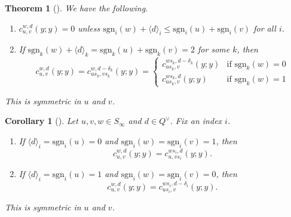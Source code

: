 \documentclass{amsart}
\newtheorem{corollary}[lemma]{Corollary}
\newtheorem{theorem}[lemma]{Theorem}
\theoremstyle{definition}
\theoremstyle{remark}
\numberwithin{equation}{section}
\begin{document}
\begin{theorem}[{\cite[Theorem~2.7]{huang2015equivariant}}] \label{theorem:quantclass}
	We have the following.
	\begin{enumerate}
	\item $c_{u,v}^{w,d}(y;y)=0$ unless $\mathrm{sgn}_i(w)+\langle d\rangle_i\leq \mathrm{sgn}_i(u)+\mathrm{sgn}_i(v)$ for all $i$.
	\item If $\mathrm{sgn}_k(w)+\langle d\rangle_k=\mathrm{sgn}_k(u)+\mathrm{sgn}_k(v)=2$ for some $k$, then
	$$c_{u,v}^{w,d}(y;y)=c_{us_k,vs_k}^{w,d-\delta_k}(y;y)=\begin{cases}
	c_{us_k,v}^{ws_k,d-\delta_k}(y;y) & \text{if $\mathrm{sgn}_k(w)=0$}\\
	c_{us_k,v}^{ws_k,d}(y;y) & \text{if $\mathrm{sgn}_k(w)=1$}
	\end{cases}$$
	\end{enumerate}
	This is symmetric in $u$ and $v$.
\end{theorem}

\begin{corollary}[{\cite[Corollary~2.8]{huang2015equivariant}}] \label{corollary:quantclass28}
	Let $u,v,w\in S_\infty$ and $d\in Q^\vee$. Fix an index $i$.
	\begin{enumerate}
	\item If $\langle d\rangle_i=\mathrm{sgn}_i(u)=0$ and $\mathrm{sgn}_i(w)=\mathrm{sgn}_i(v)=1$, then
	$$c_{u,v}^{w,d}(y;y)=c_{u,vs_i}^{ws_i,d}(y;y).$$
	\item If $\langle d\rangle_i=\mathrm{sgn}_i(u)=1$ and $\mathrm{sgn}_i(w)=\mathrm{sgn}_i(v)=0$, then
	$$c_{u,v}^{w,d}(y;y)=c_{us_i,v}^{ws_i,d-\delta_i}(y;y).$$
	\end{enumerate}
	This is symmetric in $u$ and $v$.
\end{corollary}
\end{document}
